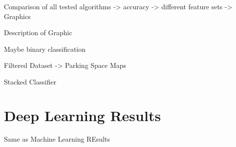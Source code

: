 Comparison of all tested algorithms -> accuracy -> different feature sets -> Graphics

Description of Graphic

Maybe binary classification

Filtered Dataset -> Parking Space Maps

Stacked Classifier


\section{Deep Learning Results}

Same as Machine Learning REsults






